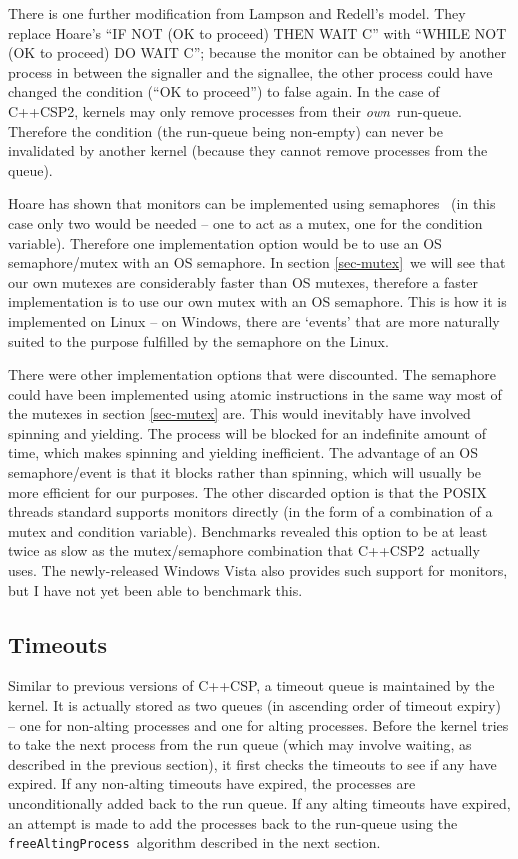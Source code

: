 \documentclass[12pt]{IOS-Book-Article-CPA-2007}
\newcommand{\code}[1]{{\small\texttt{#1}}}
\begin{document}
There is one further modification from Lampson and Redell's model.  They replace Hoare's ``IF NOT (OK to proceed) THEN WAIT C'' with ``WHILE 
NOT (OK to proceed) DO WAIT C''; because the monitor can be obtained by another process in between the signaller and the signallee, the other process 
could have changed the condition (``OK to proceed'') to false again.  In the case of C++CSP2, kernels may only remove processes from their 
\textit{own}~run-queue.  Therefore the condition (the run-queue being non-empty) can never be invalidated by another kernel (because they cannot 
remove processes from the queue).

Hoare has shown that monitors can be implemented using semaphores~\cite{hoare-monitors-74} (in this case only two would be needed -- one to act 
as a mutex, one for the condition variable).  Therefore one implementation option would be to use an OS semaphore/mutex with an OS semaphore.  In 
section \ref{sec-mutex}~we will see that our own mutexes are considerably faster than OS mutexes, therefore a faster implementation is to use our own 
mutex with an OS semaphore.  This is how it is implemented on Linux -- on Windows, there are `events' that are more naturally suited to the purpose 
fulfilled by the semaphore on the Linux.

There were other implementation options that were discounted.  The semaphore could have been implemented using atomic instructions in the same way 
most of the mutexes in section \ref{sec-mutex} are.  This would inevitably have involved spinning and yielding.  The process will be blocked for an 
indefinite amount of time, which makes spinning and yielding inefficient.  The advantage of an OS semaphore/event is that it blocks rather than 
spinning, which will usually be more efficient for our purposes.  The other discarded option is that the POSIX threads standard supports monitors 
directly (in the form of a combination of a mutex and condition variable).  Benchmarks revealed this option to be at least twice as slow as the 
mutex/semaphore combination that C++CSP2~actually uses.  The newly-released Windows Vista also provides such support for monitors, but I have not yet 
been able to benchmark this.


\subsection{Timeouts}

\label{sec-timeouts}

Similar to previous versions of C++CSP, a timeout queue is maintained by the kernel.  It is actually stored as two queues (in ascending order of timeout expiry) -- one for non-alting processes
and one for alting processes.  Before the kernel tries to take the next process from the 
run queue (which may involve waiting, as described in the previous section), it first checks the timeouts to see if any have expired.  If any 
non-alting timeouts have expired, the processes are unconditionally added back to the run queue.  If any alting timeouts have expired, an attempt 
is made to add the processes back to the run-queue using the \code{freeAltingProcess}~algorithm described in the next section. 
\end{document}
